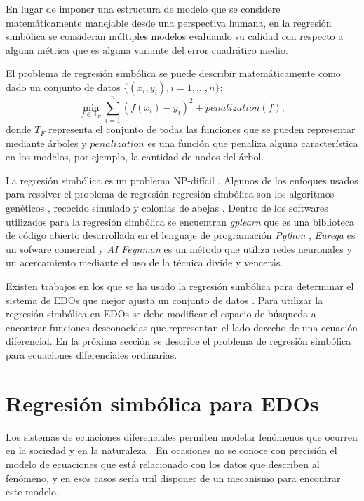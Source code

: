 En lugar de imponer una estructura de modelo que se considere matemáticamente manejable desde una perspectiva humana, en la regresión simbólica se consideran múltiples modelos evaluando su calidad con respecto a alguna métrica que es alguna variante del error cuadrático medio.

El problema de regresión simbólica se puede describir matemáticamente como dado un conjunto de datos $\{(x_i, y_i), i = 1, \dots, n\}$:
$$\min_{f\in\mathbb{T}_F} \sum_{i=1}^n (f(x_i) - y_i)^2 + penalization(f),$$
donde $T_F$ representa el conjunto de todas las funciones que se pueden representar mediante árboles y $penalization$ es una función que penaliza alguna característica en los modelos, por ejemplo, la cantidad de nodos del árbol.

La regresión simbólica  es un problema NP-difícil \cite{virgolin2022symbolic}. Algunos de los enfoques usados para resolver el problema de regresión regresión simbólica son los algoritmos genéticos \cite{koza1994genetic, schmidt2013eureqa, gaucel2014learning}, recocido simulado \cite{turing_bot} y colonias de abejas \cite{multihive,karaboga2010artificial}. Dentro de los softwares utilizados para la regresión simbólica se encuentran \textit{gplearn} que es una biblioteca de código abierto desarrollada en el lenguaje de programación \textit{Python} \cite{gplearn}, \textit{Eureqa} es un sofware  comercial \cite{schmidt2013eureqa} y \textit{AI Feynman} es un método que utiliza redes neuronales y un acercamiento mediante el uso de la técnica divide y vencerás\cite{udrescu2020ai}.

Existen trabajos en los que se ha usado la regresión simbólica para determinar el sistema de EDOs que mejor ajusta un conjunto de datos \cite{koza1994genetic, iba2008inference, gaucel2014learning, kronberger2019identification}. Para utilizar la regresión simbólica en EDOs se debe modificar el espacio de búsqueda a encontrar funciones desconocidas que representan el lado derecho de una ecuación diferencial. En la próxima sección se describe el problema de regresión simbólica para ecuaciones diferenciales ordinarias.

\section{Regresión simbólica para EDOs}\label{section:symbolic_regression_in_does}

Los sistemas de ecuaciones diferenciales permiten modelar fenómenos que ocurren en la sociedad y en la naturaleza \cite{weiss2013sir, udrescu2020ai, kuddus2021mathematical}. En ocasiones no se conoce con precisión el modelo de ecuaciones que está relacionado con los datos que describen al fenómeno, y en esos casos sería util disponer de un mecanismo para encontrar este modelo.

